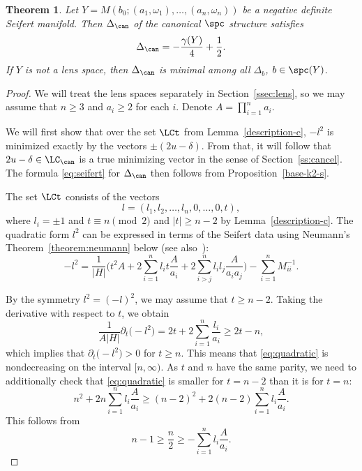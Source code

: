\documentclass[pdftex]{sigma}
\newtheorem{Theorem}{Theorem}[section]
\begin{document}
\begin{Theorem}\label{thm:seifert}
Let $Y = M(b_0;(a_1, \omega_1), \dots, (a_n, \omega_n))$ be a negative definite Seifert manifold. Then $\Delta_{\can}$ of the canonical $\spc$ structure satisfies
\begin{equation}\label{eq:seifert}
 \Delta_{\can} = -\frac{\gamma(Y)}{4} + \frac{1}{2}.
\end{equation}
If $Y$ is not a lens space, then $\Delta_{\can}$ is minimal among all $\Delta_b$, $b \in \spc(Y)$.
\end{Theorem}

\begin{proof}
We will treat the lens spaces separately in Section~\ref{ssec:lens}, so we may assume that $n \geq 3$ and $a_i \geq 2$ for each $i$. Denote $A = \prod_{i=1}^n a_i$.

We will first show that over the set $\LCt$ from Lemma~\ref{description-c}, $-l^2$ is minimized exactly by the vectors $\pm(2u-\delta)$. From that, it will follow that $2u-\delta \in \LC_{\can}$ is a true minimizing vector in the sense of Section~\ref{ss:cancel}. The formula \eqref{eq:seifert} for $\Delta_{\can}$ then follows from Proposition~\ref{base-k2-s}.

The set $\LCt$ consists of the vectors
\[
 l = (l_1, l_2, \dots, l_n, 0, \dots, 0, t),
\]
where $l_i = \pm 1$ and $t \equiv n \pmod{2}$ and $\lvert t \rvert \geq n-2$ by Lemma~\ref{description-c}. The quadratic form $l^2$ can be expressed in terms of the Seifert data using Neumann's Theorem~\ref{theorem:neumann}
below (see also~\cite[p.~19]{GKS23}):
\begin{equation}\label{eq:quadratic}
 -l^2 = \frac{1}{|H|} \Biggl(t^2 A + 2 \sum_{i=1}^n l_i t\frac{A}{a_i} +
 2 \sum_{i > j}^n l_i l_j \frac{A}{a_ia_j} \Biggr) - \sum_{i=1}^n M^{-1}_{ii}.
\end{equation}

By the symmetry $l^2 = (-l)^2$, we may assume that $t \geq n-2$. Taking the derivative with respect to $t$, we obtain
\[
\frac{1}{A |H|} \partial_t \bigl(-l^2\bigr) = 2t + 2\sum_{i=1}^n \frac{l_i}{a_i} \geq 2t - n,
\]
which implies that $\partial_t\bigl(-l^2\bigr) >0$ for $t \geq n$. This means that \eqref{eq:quadratic} is nondecreasing on the interval $[n,\infty)$. As $t$ and $n$ have the same parity, we need to additionally check that \eqref{eq:quadratic} is smaller for $t = n-2$ than it is for $t = n$:
\[
n^2+2n \sum_{i=1}^n l_i \frac{A}{a_i} \geq (n-2)^2+2(n-2)\sum_{i=1}^n l_i \frac{A}{a_i}.
\]
This follows from
\[n-1\geq \frac{n}{2} \geq -\sum_{i=1}^n l_i \frac{A}{a_i}.
\]




\end{proof}
\end{document}
